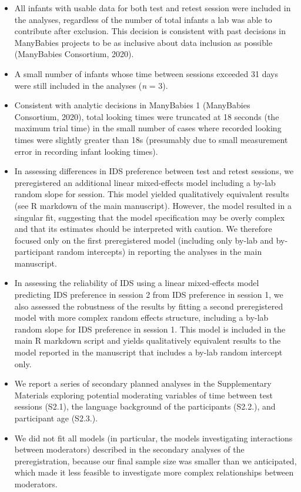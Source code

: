 \documentclass[
  man, donotrepeattitle,floatsintext]{apa6}
\providecommand{\tightlist}{%
  \setlength{\itemsep}{0pt}\setlength{\parskip}{0pt}}
\begin{document}
\begin{itemize}
\tightlist
\item
  All infants with usable data for both test and retest session were included in the analyses, regardless of the number of total infants a lab was able to contribute after exclusion. This decision is consistent with past decisions in ManyBabies projects to be as inclusive about data inclusion as possible (ManyBabies Consortium, 2020).
\item
  A small number of infants whose time between sessions exceeded 31 days were still included in the analyses (\emph{n} = 3).
\item
  Consistent with analytic decisions in ManyBabies 1 (ManyBabies Consortium, 2020), total looking times were truncated at 18 seconds (the maximum trial time) in the small number of cases where recorded looking times were slightly greater than 18s (presumably due to small measurement error in recording infant looking times).
\item
  In assessing differences in IDS preference between test and retest sessions, we preregistered an additional linear mixed-effects model including a by-lab random slope for session. This model yielded qualitatively equivalent results (see R markdown of the main manuscript). However, the model resulted in a singular fit, suggesting that the model specification may be overly complex and that its estimates should be interpreted with caution. We therefore focused only on the first preregistered model (including only by-lab and by-participant random intercepts) in reporting the analyses in the main manuscript.
\item
  In assessing the reliability of IDS using a linear mixed-effects model predicting IDS preference in session 2 from IDS preference in session 1, we also assessed the robustness of the results by fitting a second preregistered model with more complex random effects structure, including a by-lab random slope for IDS preference in session 1. This model is included in the main R markdown script and yields qualitatively equivalent results to the model reported in the manuscript that includes a by-lab random intercept only.
\item
  We report a series of secondary planned analyses in the Supplementary Materials exploring potential moderating variables of time between test sessions (S2.1), the language background of the participants (S2.2.), and participant age (S2.3.).
\item
  We did not fit all models (in particular, the models investigating interactions between moderators) described in the secondary analyses of the preregistration, because our final sample size was smaller than we anticipated, which made it less feasible to investigate more complex relationships between moderators.
\end{itemize}
\end{document}

